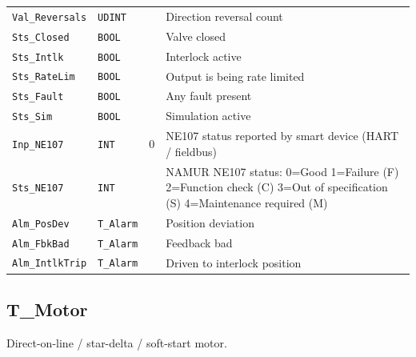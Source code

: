 \begin{small}
\begin{longtable}{@{}P{3.70cm}P{2.20cm}P{1.70cm}P{8.91cm}@{}}
\texttt{Val\_Reversals} & \texttt{UDINT} &  & Direction reversal count \\
\texttt{Sts\_Closed} & \texttt{BOOL} &  & Valve closed \\
\texttt{Sts\_Intlk} & \texttt{BOOL} &  & Interlock active \\
\texttt{Sts\_RateLim} & \texttt{BOOL} &  & Output is being rate limited \\
\texttt{Sts\_Fault} & \texttt{BOOL} &  & Any fault present \\
\texttt{Sts\_Sim} & \texttt{BOOL} &  & Simulation active \\
\texttt{Inp\_NE107} & \texttt{INT} & 0 & NE107 status reported by smart device (HART /\allowbreak{} fieldbus) \\
\texttt{Sts\_NE107} & \texttt{INT} &  & NAMUR NE107 status: 0=Good 1=Failure (F) 2=Function check (C) 3=Out of specification (S) 4=Maintenance required (M) \\
\texttt{Alm\_PosDev} & \texttt{T\_Alarm} &  & Position deviation \\
\texttt{Alm\_FbkBad} & \texttt{T\_Alarm} &  & Feedback bad \\
\texttt{Alm\_IntlkTrip} & \texttt{T\_Alarm} &  & Driven to interlock position \\
\bottomrule
\end{longtable}
\end{small}

\subsection{T\_Motor}\label{sec:pclib-t-motor}

Direct-on-line /\allowbreak{} star-delta /\allowbreak{} soft-start motor.

\par{}\par

